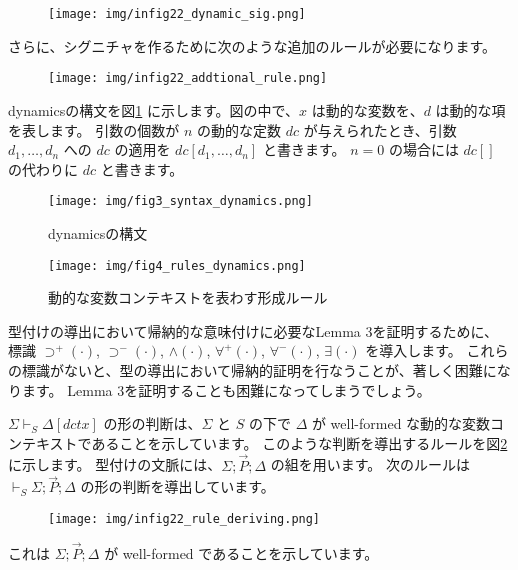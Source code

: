 \documentclass[submit,techreq,noauthor,onecolumn]{ipsj}
\begin{document}
\clearpage

\begin{figure}[h]
\centering
\texttt{[image: img/infig22\_dynamic\_sig.png]}
\end{figure}

\noindent さらに、シグニチャを作るために次のような追加のルールが必要になります。

\begin{figure}[h]
\centering
\texttt{[image: img/infig22\_addtional\_rule.png]}
\end{figure}

\noindent dynamicsの構文を図\ref{fig:fig3_syntax_dynamics} に示します。図の中で、$x$ は動的な変数を、$d$ は動的な項を表します。
引数の個数が $n$ の動的な定数 $dc$ が与えられたとき、引数 $d_1,\ldots,d_n$ への $dc$ の適用を $dc[d_1,\ldots,d_n]$ と書きます。
$n = 0$ の場合には $dc[]$ の代わりに $dc$ と書きます。

\begin{figure}[h]
\centering
\texttt{[image: img/fig3\_syntax\_dynamics.png]}
\caption{dynamicsの構文}
\label{fig:fig3_syntax_dynamics}
\end{figure}

\begin{figure}[h]
\centering
\texttt{[image: img/fig4\_rules\_dynamics.png]}
\caption{動的な変数コンテキストを表わす形成ルール}
\label{fig:fig4_rules_dynamics}
\end{figure}

型付けの導出において帰納的な意味付けに必要なLemma 3を証明するために、標識 $\supset^+(\cdot)$, $\supset^-(\cdot)$, $\wedge(\cdot)$, $\forall^+(\cdot)$, $\forall^-(\cdot)$, $\exists(\cdot)$ を導入します。
これらの標識がないと、型の導出において帰納的証明を行なうことが、著しく困難になります。
Lemma 3を証明することも困難になってしまうでしょう。

$\Sigma \vdash_S \Delta [dctx]$ の形の判断は、$\Sigma$ と $S$ の下で $\Delta$ が well-formed な動的な変数コンテキストであることを示しています。
このような判断を導出するルールを図\ref{fig:fig4_rules_dynamics}に示します。
型付けの文脈には、$\Sigma; \vec{P}; \Delta$ の組を用います。
次のルールは $\vdash_S \Sigma; \vec{P}; \Delta$ の形の判断を導出しています。

\begin{figure}[h]
\centering
\texttt{[image: img/infig22\_rule\_deriving.png]}
\end{figure}

\noindent これは $\Sigma; \vec{P}; \Delta$ が well-formed であることを示しています。
\end{document}
